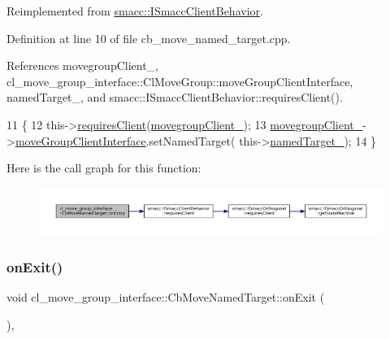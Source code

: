 Reimplemented from \hyperlink{classsmacc_1_1ISmaccClientBehavior_a3ec24a839087c550e1d62a81e48cf530}{smacc\+::\+I\+Smacc\+Client\+Behavior}.



Definition at line 10 of file cb\+\_\+move\+\_\+named\+\_\+target.\+cpp.



References movegroup\+Client\+\_\+, cl\+\_\+move\+\_\+group\+\_\+interface\+::\+Cl\+Move\+Group\+::move\+Group\+Client\+Interface, named\+Target\+\_\+, and smacc\+::\+I\+Smacc\+Client\+Behavior\+::requires\+Client().


\begin{DoxyCode}
11 \{
12     this->\hyperlink{classsmacc_1_1ISmaccClientBehavior_a32b16e99e3b4cb289414203dc861a440}{requiresClient}(\hyperlink{classcl__move__group__interface_1_1CbMoveNamedTarget_ab19a253b419bdbf3ec4b4b45a4198a65}{movegroupClient\_});
13     \hyperlink{classcl__move__group__interface_1_1CbMoveNamedTarget_ab19a253b419bdbf3ec4b4b45a4198a65}{movegroupClient\_}->\hyperlink{classcl__move__group__interface_1_1ClMoveGroup_a92922ea689e4e1b7b91512c56629c95b}{moveGroupClientInterface}.setNamedTarget(
      this->\hyperlink{classcl__move__group__interface_1_1CbMoveNamedTarget_a597a5afdcba0359aaa8d3f923fdfe133}{namedTarget\_});
14 \}
\end{DoxyCode}
Here is the call graph for this function\+:
\nopagebreak
\begin{figure}[H]
\begin{center}
\leavevmode
\includegraphics[width=350pt]{classcl__move__group__interface_1_1CbMoveNamedTarget_ab212edda280e896977d7ac567e4c1b29_cgraph}
\end{center}
\end{figure}
\mbox{\label{classcl__move__group__interface_1_1CbMoveNamedTarget_ae7e89742c903577b71790370714047d8}} 
\subsubsection{\texorpdfstring{on\+Exit()}{onExit()}}
{\footnotesize\ttfamily void cl\+\_\+move\+\_\+group\+\_\+interface\+::\+Cb\+Move\+Named\+Target\+::on\+Exit (\begin{DoxyParamCaption}{ }\end{DoxyParamCaption})\hspace{0.3cm}{\ttfamily [override]}, {\ttfamily [virtual]}}



